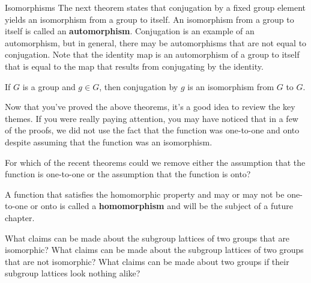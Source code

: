 \begin{section}{Isomorphisms}
The next theorem states that conjugation by a fixed group element yields an isomorphism from a group to itself.  An isomorphism from a group to itself is called an \textbf{automorphism}.  Conjugation is an example of an automorphism, but in general, there may be automorphisms that are not equal to conjugation.  Note that the identity map is an automorphism of a group to itself that is equal to the map that results from conjugating by the identity.

\begin{theorem}
If $G$ is a group and $g\in G$, then conjugation by $g$ is an isomorphism from $G$ to $G$.
\end{theorem}

Now that you've proved the above theorems, it's a good idea to review the key themes.  If you were really paying attention, you may have noticed that in a few of the proofs, we did not use the fact that the function was one-to-one and onto despite assuming that the function was an isomorphism.

\begin{problem}
For which of the recent theorems could we remove either the assumption that the function is one-to-one or the assumption that the function is onto?
\end{problem}

A function that satisfies the homomorphic property and may or may not be one-to-one or onto is called a \textbf{homomorphism} and will be the subject of a future chapter.

\begin{problem}
What claims can be made about the subgroup lattices of two groups that are isomorphic? What claims can be made about the subgroup lattices of two groups that are not isomorphic?  What claims can be made about two groups if their subgroup lattices look nothing alike?
\end{problem}

\end{section}